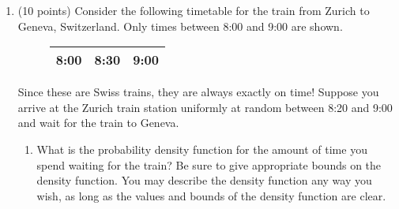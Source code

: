\documentclass[12pt]{article}
\def\P{{\mathbb P}}
\def\E{{\mathbb E}}
\begin{document}
\begin{enumerate}
\begin{enumerate}
There are again many ways to do this. We will use linearity of expectation together with part (b). This time, label the $r$ red balls $1, 2, \dots, r$. Define the indicator random variables $R_i$ by
\[
R_i = \begin{cases}
1 & \text{red ball $i$ is in your sample}\\
0 & \text{red ball $i$ is \emph{not} in your sample }
\end{cases}
\]
Let $R$ be the number of red balls in your sample. Then $R = \sum_{i=1}^r R_i$. By linearity of expectation, 
\[
E(R) = \sum_{i=1}^r \E(R_i)
\]
For each indicator random variable, 
\begin{align*}
E(R_i) &= 0 \cdot \P(R_i = 0) + 1 \cdot \P(R_i = 1) \\
&= \P(R_i = 1)\\
&= \P(\text{red ball $i$ is in your sample}) \\
&= \dfrac{ n }{ r+w }
\end{align*}
where the last line is from part (b), since the probability is the same for any red ball $i$ as it is for red ball 1 by symmetry. Thus we have:
\begin{align*}
\E(R) &= \sum_{i=1}^r \E(R_i) \\
&= \sum_{i=1}^r \dfrac{ n }{ r+w } \\
&= r \left( \dfrac{ n }{ r+w } \right)\\
&= n \left( \dfrac{ r }{ r+w } \right)
\end{align*}
Note that this expected value is the \emph{same} as that of a binomial random variable with parameter $p = r / (r + w)$, thus the expected number of red balls in the sample is the same whether we sample without replacement (hypergeometric) or with replacement (binomial).

\end{enumerate}

\pagebreak

\item (10 points) Consider the following timetable for the train from Zurich to Geneva, Switzerland. Only times between 8:00 and 9:00 are shown.
\begin{figure}[H]
\centering
\label{my-label}
\begin{tabular}{|l|l|l|}
\hline
8:00 & 8:30 & 9:00 \\ \hline
\end{tabular}
\end{figure}
Since these are Swiss trains, they are always exactly on time! Suppose you arrive at the Zurich train station uniformly at random between 8:20 and 9:00 and wait for the train to Geneva. 
\begin{enumerate}
\item What is the probability density function for the amount of time you spend waiting for the train? Be sure to give appropriate bounds on the density function. You may describe the density function any way you wish, as long as the values and bounds of the density function are clear.\\


\end{enumerate}
\end{enumerate}
\end{document}
